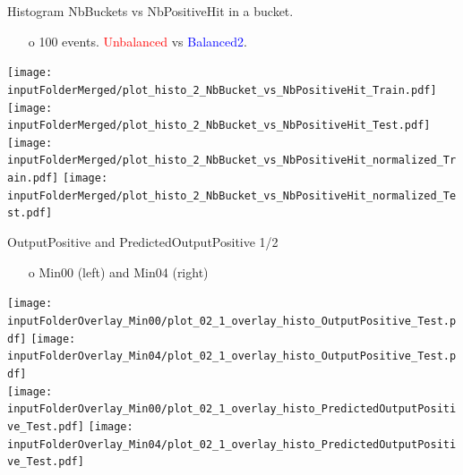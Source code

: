 \documentclass{beamer}
\begin{document}
\begin{frame}{Histogram NbBuckets vs NbPositiveHit in a bucket.}
\begin{enumerate}
\item[o] 100 events. \textcolor{red}{Unbalanced} vs \textcolor{blue}{Balanced2}.
\end{enumerate}
\centering
\texttt{[image: \\inputFolderMerged/plot\_histo\_2\_NbBucket\_vs\_NbPositiveHit\_Train.pdf]}
\texttt{[image: \\inputFolderMerged/plot\_histo\_2\_NbBucket\_vs\_NbPositiveHit\_Test.pdf]}\\
\texttt{[image: \\inputFolderMerged/plot\_histo\_2\_NbBucket\_vs\_NbPositiveHit\_normalized\_Train.pdf]}
\texttt{[image: \\inputFolderMerged/plot\_histo\_2\_NbBucket\_vs\_NbPositiveHit\_normalized\_Test.pdf]}\\
\end{frame}






\begin{frame}{OutputPositive and PredictedOutputPositive 1/2}
\begin{enumerate}
\item[o] Min00 (left) and Min04 (right)
\end{enumerate}
\centering
\texttt{[image: \\inputFolderOverlay\_Min00/plot\_02\_1\_overlay\_histo\_OutputPositive\_Test.pdf]}
\texttt{[image: \\inputFolderOverlay\_Min04/plot\_02\_1\_overlay\_histo\_OutputPositive\_Test.pdf]}\\
\texttt{[image: \\inputFolderOverlay\_Min00/plot\_02\_1\_overlay\_histo\_PredictedOutputPositive\_Test.pdf]}
\texttt{[image: \\inputFolderOverlay\_Min04/plot\_02\_1\_overlay\_histo\_PredictedOutputPositive\_Test.pdf]}\\
\end{frame}
\end{document}
